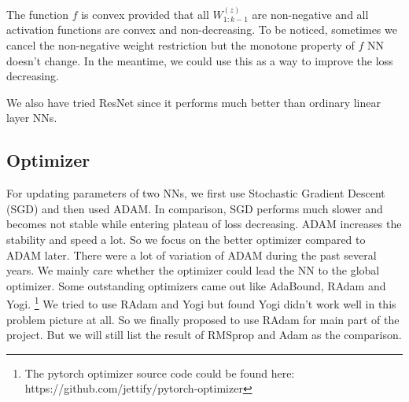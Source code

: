 \documentclass[conference,compsoc]{IEEEtran}
\begin{document}
The function $f$ is convex provided that all $W_{1:k-1}^{(z)}$ are non-negative and all activation functions are convex and non-decreasing. To be noticed, sometimes we cancel the non-negative weight restriction but the monotone property of $f$ NN doesn't change. In the meantime, we could use this as a way to improve the loss decreasing.

We also have tried ResNet\cite{he2016deep} since it performs much better than ordinary linear layer NNs. 

\subsection{Optimizer}
For updating parameters of two NNs, we first use Stochastic Gradient Descent (SGD) and then used ADAM. In comparison, SGD performs much slower and becomes not stable while entering plateau of loss decreasing. ADAM increases the stability and speed a lot. So we focus on the better optimizer compared to ADAM later. There were a lot of variation of ADAM during the past several years. We mainly care whether the optimizer could lead the NN to the global optimizer. Some outstanding optimizers came out like AdaBound\cite{luo2019adaptive}, RAdam\cite{liu2019variance} and Yogi\cite{zaheer2018adaptive}. \footnote{The pytorch optimizer source code could be found here: https://github.com/jettify/pytorch-optimizer}
We tried to use RAdam and Yogi but found Yogi didn't work well in this problem picture at all. So we finally proposed to use RAdam for main part of the project. But we will still list the result of RMSprop and Adam as the comparison.
\end{document}
